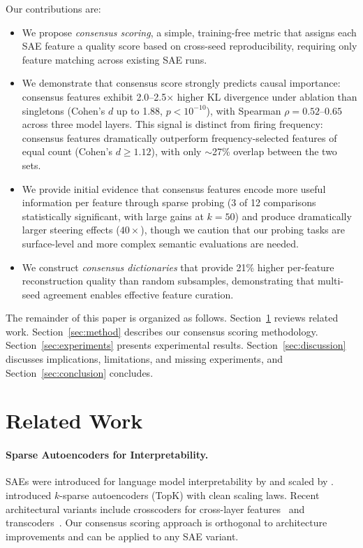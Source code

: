 \documentclass{article}
\begin{document}
Our contributions are:
\begin{itemize}
    \item We propose \emph{consensus scoring}, a simple, training-free metric that assigns each SAE feature a quality score based on cross-seed reproducibility, requiring only feature matching across existing SAE runs.
    \item We demonstrate that consensus score strongly predicts causal importance: consensus features exhibit 2.0--2.5$\times$ higher KL divergence under ablation than singletons (Cohen's $d$ up to 1.88, $p < 10^{-10}$), with Spearman $\rho = 0.52$--$0.65$ across three model layers. This signal is distinct from firing frequency: consensus features dramatically outperform frequency-selected features of equal count (Cohen's $d \geq 1.12$), with only $\sim$27\% overlap between the two sets.
    \item We provide initial evidence that consensus features encode more useful information per feature through sparse probing (3 of 12 comparisons statistically significant, with large gains at $k{=}50$) and produce dramatically larger steering effects ($40\times$), though we caution that our probing tasks are surface-level and more complex semantic evaluations are needed.
    \item We construct \emph{consensus dictionaries} that provide 21\% higher per-feature reconstruction quality than random subsamples, demonstrating that multi-seed agreement enables effective feature curation.
\end{itemize}

The remainder of this paper is organized as follows. Section~\ref{sec:related} reviews related work. Section~\ref{sec:method} describes our consensus scoring methodology. Section~\ref{sec:experiments} presents experimental results. Section~\ref{sec:discussion} discusses implications, limitations, and missing experiments, and Section~\ref{sec:conclusion} concludes.

\section{Related Work}
\label{sec:related}

\paragraph{Sparse Autoencoders for Interpretability.}
SAEs were introduced for language model interpretability by \citet{cunningham2023sparse} and scaled by \citet{bricken2023monosemanticity}. \citet{gao2024scaling} introduced $k$-sparse autoencoders (TopK) with clean scaling laws. Recent architectural variants include crosscoders for cross-layer features~\citep{lieberum2024crosscoders} and transcoders~\citep{dunefsky2025transcoders}. Our consensus scoring approach is orthogonal to architecture improvements and can be applied to any SAE variant.
\end{document}
